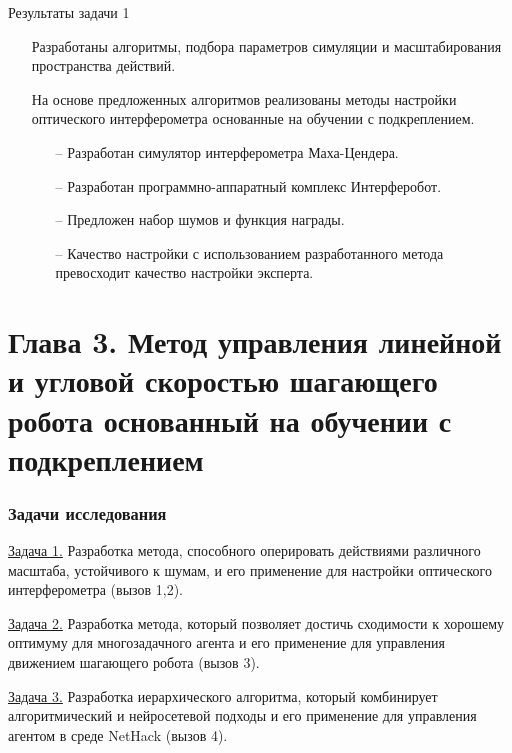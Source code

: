 \begin{frame}{Результаты задачи 1}
\begin{itemize}
    \item[\textcolor{ForestGreen}{\checkmark}] Разработаны алгоритмы, подбора параметров симуляции и масштабирования пространства действий. 
    \item[\textcolor{ForestGreen}{\checkmark}] На основе предложенных алгоритмов реализованы методы настройки оптического интерферометра основанные на обучении с подкреплением.
    \begin{itemize}
        \item[--] Разработан симулятор интерферометра Маха-Цендера.
        \item[--] Разработан программно-аппаратный комплекс Интерферобот.
        \item[--] Предложен набор шумов и функция награды.
        \item[--] Качество настройки с использованием разработанного метода превосходит качество настройки эксперта.
    \end{itemize}
    
    
\end{itemize}
    



\end{frame}



\section{Глава 3. Метод управления линейной и угловой скоростью шагающего робота основанный на обучении с подкреплением}

\begin{frame}
    \frametitle{Задачи исследования}
    \begin{itemize} 
        \item \underline{Задача 1.} Разработка метода, способного оперировать действиями различного масштаба, устойчивого к шумам, и его применение для настройки оптического интерферометра (вызов 1,2).
        {\color{orange}\item \underline{Задача 2.} Разработка метода, который позволяет достичь сходимости к хорошему оптимуму для многозадачного агента и его применение  для управления движением шагающего робота (вызов 3).}
        \item \underline{Задача 3.} Разработка иерархического алгоритма, который комбинирует алгоритмический и нейросетевой подходы и его применение для управления агентом в среде NetHack (вызов 4).
    \end{itemize}
\end{frame}

